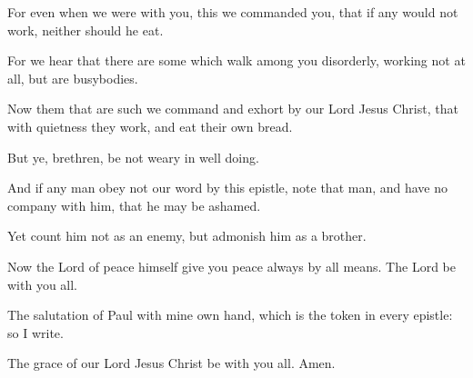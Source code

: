 \Verse For even when we were with you, this we commanded you, that if any would not work, neither should he eat.

\Verse For we hear that there are some which walk among you disorderly, working not at all, but are busybodies.

\Verse Now them that are such we command and exhort by our Lord Jesus Christ, that with quietness they work, and eat their own bread.

\Verse But ye, brethren, be not weary in well doing.

\Verse And if any man obey not our word by this epistle, note that man, and have no company with him, that he may be ashamed.

\Verse Yet count him not as an enemy, but admonish him as a brother.

\Verse Now the Lord of peace himself give you peace always by all means.  The Lord be with you all.

\Verse The salutation of Paul with mine own hand, which is the token in every epistle: so I write.

\Verse The grace of our Lord Jesus Christ be with you all. Amen.

